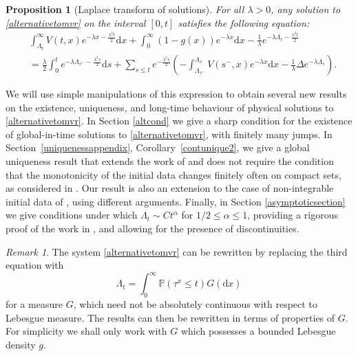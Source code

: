 \documentclass[11pt]{article}
\theoremstyle{plain}
\newtheorem{proposition}[theorem]{Proposition}
\theoremstyle{remark}
\newtheorem{remark}[theorem]{Remark}
\theoremstyle{definition}
\numberwithin{equation}{section}
\begin{document}
\begin{proposition}[Laplace transform of solutions]
\label{Ito}
For all $\lambda>0$, any solution to \eqref{alternativetomvr} on the interval $[0,t]$ satisfies the following equation:
\begin{align}&\int_{\Lambda_t}^\infty V(t,x)e^{-\lambda x-\frac{\lambda^2t}{2}}\textrm{d}x+\int_0^\infty (1-g(x))e^{-\lambda x}\textrm{d}x-\frac{1}{\lambda}e^{-\lambda \Lambda_t-\frac{\lambda^2t}{2}}\\&=\frac{\lambda}{2}\int_0^te^{-\lambda\Lambda_{s^-}-\frac{\lambda^2s}{2}}\textrm{d}s+\sum_{s\leq t}e^{-\frac{\lambda^2s}{2}}\left(-\int_{\Lambda_{s^-}}^{\Lambda_s} V(s^-,x)e^{-\lambda x}\textrm{d}x-\frac{1}{\lambda}\Delta e^{-\lambda\Lambda_s}\right).\nonumber
\end{align}
\end{proposition}

We will use simple manipulations of this expression to obtain several new results on the existence, uniqueness, and long-time behaviour of physical solutions to \eqref{alternativetomvr}. 
In Section \ref{altcond} we give a sharp condition for the existence of global-in-time solutions to \eqref{alternativetomvr}, with finitely many jumps. In Section~\ref{uniquenessappendix}, Corollary~\ref{contunique2}, we give a global uniqueness result that extends the work of \cite{mustapha2023wellposednesssupercooledstefanproblem} and does not require the condition that the monotonicity of the initial data changes finitely often on compact sets, as considered in \cite{3}. Our result is also an extension to the case of non-integrable initial data of \cite[Theorem 1.7]{munoz2026freeboundaryregularitywellposedness}, using different arguments. %
 Finally, in Section \ref{asymptoticsection} we give conditions under which $\Lambda_t\sim Ct^\alpha$ for $1/2\leq \alpha\leq 1$, providing a rigorous proof of the work in \cite{4}, and allowing for the presence of discontinuities. 

\begin{remark}
    The system \eqref{alternativetomvr} can be rewritten by replacing the third equation with
$$\Lambda_t =\int_0^\infty \mathbb{P}(\tau^x\leq t)G(\textrm{d}x)$$
for a measure $G$, which need not be absolutely continuous with respect to Lebesgue measure. The results can then be rewritten in terms of properties of $G$. For simplicity we shall only work with $G$ which possesses a bounded Lebesgue density $g$. 
\end{remark}
\end{document}
